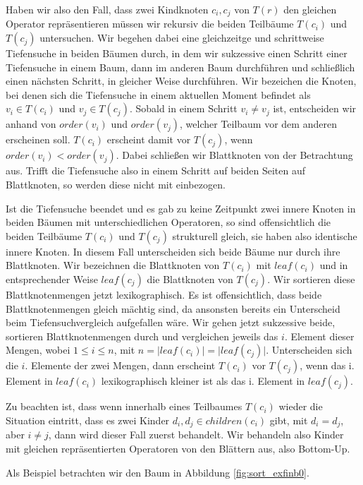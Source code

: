 Haben wir also den Fall, dass zwei Kindknoten $c_i,c_j$ von $T(r)$ den gleichen Operator repräsentieren müssen wir rekursiv die beiden Teilbäume $T(c_i)$ und $T(c_j)$ untersuchen. Wir begehen dabei eine gleichzeitge und schrittweise Tiefensuche in beiden Bäumen durch, in dem wir sukzessive einen Schritt einer Tiefensuche in einem Baum, dann im anderen Baum durchführen und schließlich einen nächsten Schritt, in gleicher Weise durchführen. Wir bezeichen die Knoten, bei denen sich die Tiefensuche in einem aktuellen Moment befindet als $v_i\in T(c_i)$ und $v_j\in T(c_j)$. Sobald in einem Schritt $v_i \neq v_j$ ist, entscheiden wir anhand von $\mathit{order}(v_i)$ und $\mathit{order}(v_j)$, welcher Teilbaum vor dem anderen erscheinen soll. $T(c_i)$ erscheint damit vor $T(c_j)$, wenn $\mathit{order}(v_i) < \mathit{order}(v_j)$. Dabei schließen wir Blattknoten von der Betrachtung aus. Trifft die Tiefensuche also in einem Schritt auf beiden Seiten auf Blattknoten, so werden diese nicht mit einbezogen.

Ist die Tiefensuche beendet und es gab zu keine Zeitpunkt zwei innere Knoten in beiden Bäumen mit unterschiedlichen Operatoren, so sind offensichtlich die beiden Teilbäume $T(c_i)$ und $T(c_j)$ strukturell gleich, sie haben also identische innere Knoten. In diesem Fall unterscheiden sich beide Bäume nur durch ihre Blattknoten. Wir bezeichnen die Blattknoten von $T(c_i)$ mit $leaf(c_i)$ und in entsprechender Weise $leaf(c_j)$ die Blattknoten von $T(c_j)$. Wir sortieren diese Blattknotenmengen jetzt lexikographisch. Es ist offensichtlich, dass beide Blattknotenmengen gleich mächtig sind, da ansonsten bereits ein Unterscheid beim Tiefensuchvergleich aufgefallen wäre. Wir gehen jetzt sukzessive beide, sortieren Blattknotenmengen durch und vergleichen jeweils das $i.$ Element dieser Mengen, wobei $1\le i \le n$, mit $n=\vert \mathit{leaf}(c_i)\vert = \vert \mathit{leaf}(c_j) \vert$. Unterscheiden sich die $i.$ Elemente der zwei Mengen, dann erscheint $T(c_i)$ vor $T(c_j)$, wenn das i. Element in $\mathit{leaf(c_i)}$ lexikographisch kleiner ist als das i. Element in $\mathit{leaf(c_j)}$.

Zu beachten ist, dass wenn innerhalb eines Teilbaumes $T(c_i)$ wieder die Situation eintritt, dass es zwei Kinder $d_i,d_j\in\mathit{children}(c_i)$ gibt, mit $d_i=d_j$, aber $i\neq j$, dann wird dieser Fall zuerst behandelt. Wir behandeln also Kinder mit gleichen repräsentierten Operatoren von den Blättern aus, also Bottom-Up.

Als Beispiel betrachten wir den Baum in Abbildung \ref{fig:sort_exfinb0}.

